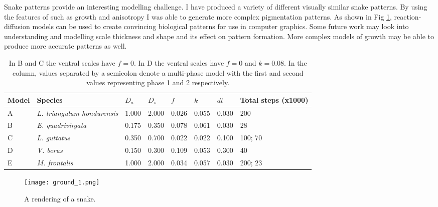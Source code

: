 Snake patterns provide an interesting modelling challenge. I have produced a variety of different visually similar snake patterns. By using the features of \ProgramName{} such as growth and anisotropy I was able to generate more complex pigmentation patterns. As shown in Fig \ref{fig:SnakeRendering}, reaction-diffusion models can be used to create convincing biological patterns for use in computer graphics. Some future work may look into understanding and modelling scale thickness and shape and its effect on pattern formation. More complex models of growth may be able to produce more accurate patterns as well.

\begin{table}[h]
	\centering
	\begin{tabular}{|l|l|l|l|l|l|l|l|}
	\hline
	Model & Species                      &$D_a$ &$D_s$ &$f$    &$k$   &$dt$ &Total steps (x1000)\\ \hline 
	A     &\textit{L. triangulum hondurensis} &1.000 &2.000 &0.026 &0.055 &0.030 &200                \\ \hline
	B     &\textit{E. quadrivirgata}     &0.175 &0.350 &0.078 &0.061 &0.030 &28                 \\ \hline
	C     &\textit{L. guttatus}          &0.350 &0.700 &0.022 &0.022 &0.100 &100; 70            \\ \hline
	D     &\textit{V. berus}             &0.150 &0.300 &0.109 &0.053 &0.300 &40                 \\ \hline
	E     &\textit{M. frontalis}         &1.000 &2.000 &0.034 &0.057 &0.030 &200; 23            \\ \hline
	\end{tabular}
	\caption {In B and C the ventral scales have $f=0$. In D the ventral scales have $f=0$ and $k=0.08$. In the  column, values separated by a semicolon denote a multi-phase model with the first and second values representing phase 1 and 2 respectively.}
	\label{tab:snakeParameters}
\end{table}

\begin{figure}[p]
	\centering
	\texttt{[image: ground\_1.png]}
	\caption{A rendering of a snake.}
	\label{fig:SnakeRendering}
\end{figure}